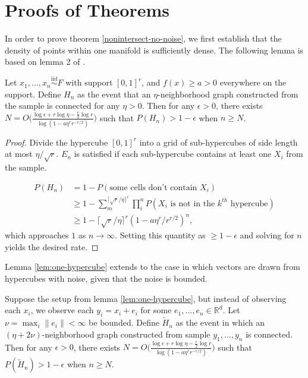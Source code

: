 \documentclass[12pt]{article}
\begin{document}
\appendix

\section{Proofs of Theorems}

In order to prove theorem \ref{nonintersect-no-noise}, we first
establish that the density of points within one manifold is sufficiently
dense. The following lemma is based on lemma 2 of
\citet{trosset2020rehabilitating}.

\begin{lemma}
\label{lem:one-hypercube}
Let $x_1, ..., x_n \stackrel{\mathrm{iid}}{\sim}F$ with support $[0, 1]^r$, and $f(x) \geq a > 0$ everywhere on the support. 
Define $H_n$ as the event that an $\eta$-neighborhood graph constructed from the sample is connected for any $\eta > 0$. 
Then for any $\epsilon > 0$, there exists $N = O \bigg( \frac{\log \epsilon + r \log \eta - \frac{r}{2} \log r}{\log (1 - a \eta^r r^{-r / 2})} \bigg)$ such that $P(H_n) > 1 - \epsilon$ when $n \geq N$.
\end{lemma}

\begin{proof}
Divide the hypercube $[0, 1]^r$ into a grid of sub-hypercubes of side length at most $\eta / \sqrt{r}$. 
$E_n$ is satisfied if each sub-hypercube contains at least one $X_i$ from the sample. 

$$
\begin{aligned}
P(H_n) & = 1 - P(\text{some cells don't contain } X_i) \\
& \geq 1 - \sum_m^{\lceil \sqrt{r} / \eta \rceil^r} \prod_i^n P(X_i \text{ is not in the } k^{th} \text{ hypercube}) \\
& \geq 1 - \lceil \sqrt{r} / \eta \rceil^r (1 - a \eta^r / r^{r/2})^n,
\end{aligned}
$$
which approaches $1$ as $n \to \infty$. 
Setting this quantity as  $\geq 1 - \epsilon$ and solving for $n$ yields the desired rate. 
\end{proof}

Lemma \ref{lem:one-hypercube} extends to the case in which vectors are
drawn from hypercubes with noise, given that the noise is bounded.

\begin{lemma}
\label{lem:one-hypercube-noise}
Suppose the setup from lemma \ref{lem:one-hypercube}, but instead of observing each $x_i$, we observe each $y_i = x_i + e_i$ for some $e_1, ..., e_n \in \mathbb{R}^d$. 
Let $\nu = \max_i \|e_i\| < \infty$ be bounded. 
Define $\tilde{H}_n$ as the event in which an $(\eta + 2 \nu)$-neighborhood graph constructed from sample $y_1, ..., y_n$ is connected. 
Then for any $\epsilon > 0$, there exists $N = O \bigg( \frac{\log \epsilon + r \log \eta - \frac{r}{2} \log r}{\log (1 - a \eta^r r^{-r / 2})} \bigg)$ such that $P(\tilde{H}_n) > 1 - \epsilon$ when $n \geq N$.
\end{lemma}
\end{document}
